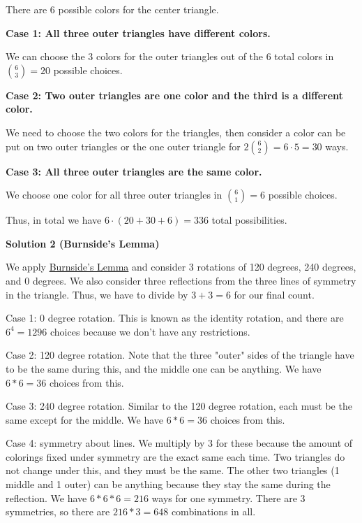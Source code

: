 \begin{enumerate}
 There are 6 possible colors for the center triangle.

 
\textbf{Case 1: All three outer triangles have different colors.}

 We can choose the $3$ colors for the outer triangles out of the $6$ total colors in ${6 \choose 3} = 20$ possible choices.

 \textbf{Case 2: Two outer triangles are one color and the third is a different color.}

 We need to choose the two colors for the triangles, then consider a color can be put on two outer triangles or the one outer triangle for $2 {6 \choose 2} = 6 \cdot 5 = 30$ ways.

 \textbf{Case 3: All three outer triangles are the same color.}

 We choose one color for all three outer triangles in ${6\choose 1} = 6$ possible choices.

 
Thus, in total we have $6\cdot(20 + 30 + 6) = \boxed{336}$ total possibilities.

 



\textbf{Solution 2 (Burnside's Lemma)}

We apply \href{https://artofproblemsolving.com/wiki/index.php?title=Burnside\%27s\_Lemma}{Burnside's Lemma} and consider 3 rotations of 120 degrees, 240 degrees, and 0 degrees. We also consider three reflections from the three lines of symmetry in the triangle. Thus, we have to divide by $3+3=6$ for our final count. 

 Case 1: 0 degree rotation. This is known as the identity rotation, and there are $6^4=1296$ choices because we don't have any restrictions.

 Case 2: 120 degree rotation. Note that the three "outer" sides of the triangle have to be the same during this, and the middle one can be anything. We have $6*6=36$ choices from this. 

 Case 3: 240 degree rotation. Similar to the 120 degree rotation, each must be the same except for the middle. We have $6*6=36$ choices from this.

 Case 4: symmetry about lines. We multiply by 3 for these because the amount of colorings fixed under symmetry are the exact same each time. Two triangles do not change under this, and they must be the same. The other two triangles (1 middle and 1 outer) can be anything because they stay the same during the reflection. We have $6*6*6=216$ ways for one symmetry. There are 3 symmetries, so there are $216*3=648$ combinations in all.


\end{enumerate}
